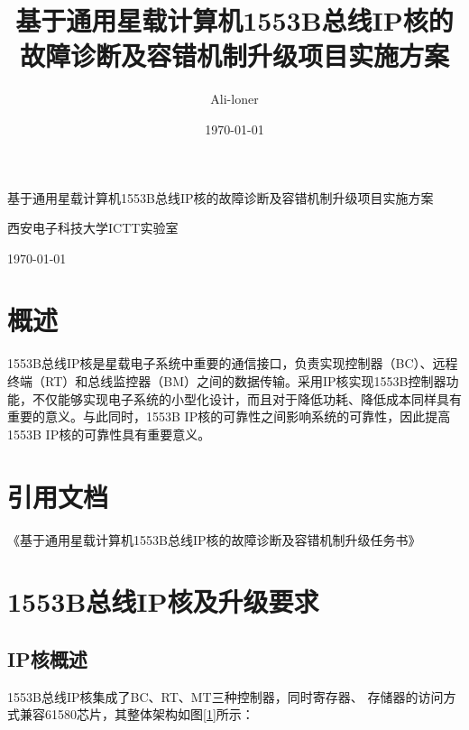 \documentclass[fontset=windows]{article}
\title{\heiti\zihao{2} 基于通用星载计算机1553B总线IP核的故障诊断及容错机制升级项目实施方案}
\author{\songti Ali-loner}
\date{\today}
\begin{document}
\begin{titlepage}
    \centering
    \vspace*{4cm}
    {\heiti{} 基于通用星载计算机1553B总线IP核的故障诊断及容错机制升级项目实施方案\par}
    \vspace{2cm}
    {\songti{} 西安电子科技大学ICTT实验室\par}
    \vspace{0.5cm}
    { \today\par}
    \vfill
\end{titlepage}

\clearpage

\pagestyle{main}

\tableofcontents
\clearpage


\section{概述}
1553B总线IP核是星载电子系统中重要的通信接口，负责实现控制器（BC）、远程终端（RT）和总线监控器（BM）之间的数据传输。采用IP核实现1553B控制器功能，不仅能够实现电子系统的小型化设计，而且对于降低功耗、降低成本同样具有重要的意义。与此同时，1553B IP核的可靠性之间影响系统的可靠性，因此提高1553B IP核的可靠性具有重要意义。


\section{引用文档}
《基于通用星载计算机1553B总线IP核的故障诊断及容错机制升级任务书》

\section{1553B总线IP核及升级要求}
\subsection{IP核概述}
1553B总线IP核集成了BC、RT、MT三种控制器，同时寄存器、
存储器的访问方式兼容61580芯片，其整体架构如图\ref{1}所示：
\end{document}
